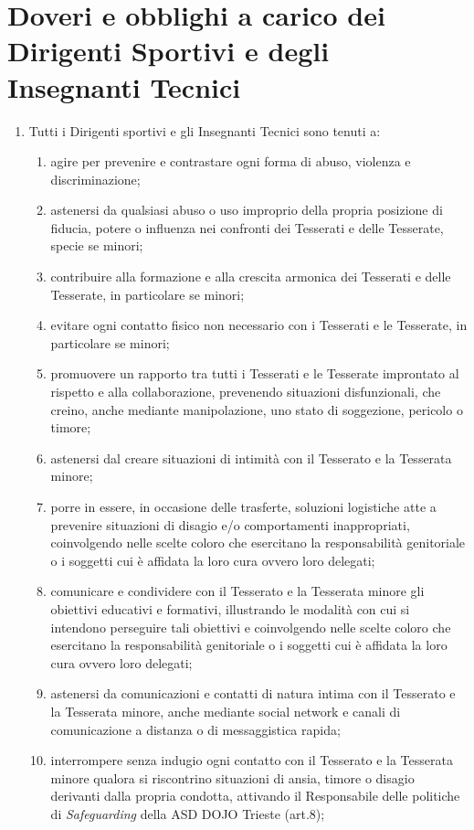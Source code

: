 \documentclass{djtsdoc}
\begin{document}
	\section{Doveri e obblighi a carico dei Dirigenti Sportivi e degli Insegnanti Tecnici}
	\begin{enumerate}
		\item Tutti i Dirigenti sportivi e gli Insegnanti Tecnici sono tenuti a:
		\begin{enumerate}
			\item agire per prevenire e contrastare ogni forma di abuso, violenza e discriminazione;
			\item astenersi da qualsiasi abuso o uso improprio della propria posizione di fiducia, potere o 	influenza nei confronti dei Tesserati e delle Tesserate, specie se minori;
			\item contribuire alla formazione e alla crescita armonica dei Tesserati e delle Tesserate, in 	particolare	se minori;
			\item evitare ogni contatto fisico non necessario con i Tesserati e le Tesserate, in particolare se 	minori;
			\item promuovere un rapporto tra tutti i Tesserati e le Tesserate improntato al rispetto e alla	collaborazione, prevenendo situazioni disfunzionali, che creino, anche mediante manipolazione, uno stato di soggezione, pericolo o timore;
			\item astenersi dal creare situazioni di intimità con il Tesserato e la Tesserata minore;
			\item porre in essere, in occasione delle trasferte, soluzioni logistiche atte a prevenire situazioni di disagio e/o comportamenti inappropriati, coinvolgendo nelle scelte coloro che esercitano la	responsabilità genitoriale o i soggetti cui è affidata la loro cura ovvero loro delegati;
			\item comunicare e condividere con il Tesserato e la Tesserata minore gli obiettivi educativi e	formativi,	illustrando le modalità con cui si intendono perseguire tali obiettivi e	coinvolgendo nelle scelte coloro che esercitano la responsabilità genitoriale o i soggetti cui è affidata la loro cura ovvero loro delegati;
			\item astenersi da comunicazioni e contatti di natura intima con il Tesserato e la Tesserata minore, 	anche mediante social network e canali di comunicazione a distanza o di messaggistica rapida;
			\item interrompere senza indugio ogni contatto con il Tesserato e la Tesserata minore qualora si 	riscontrino situazioni di ansia, timore o disagio derivanti dalla propria condotta, attivando il 	Responsabile delle politiche di \textit{Safeguarding} della ASD DOJO Trieste (art.8);

\end{enumerate}
\end{enumerate}
\end{document}
